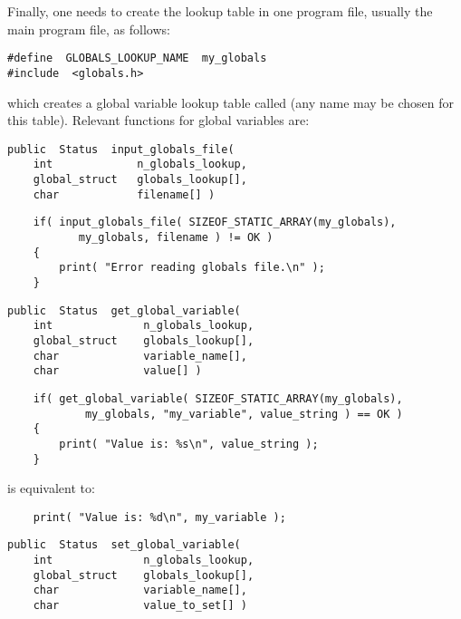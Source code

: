 Finally, one needs to create the lookup table in one program file,
usually the main program file, as follows:
{\bf\begin{verbatim}
#define  GLOBALS_LOOKUP_NAME  my_globals
#include  <globals.h>
\end{verbatim}}
which creates a global variable lookup table called
 (any name may be chosen for this table).
Relevant functions for global variables are:


{\bf\begin{verbatim}
public  Status  input_globals_file(
    int             n_globals_lookup,
    global_struct   globals_lookup[],
    char            filename[] )
\end{verbatim}}

{\bf\begin{verbatim}
    if( input_globals_file( SIZEOF_STATIC_ARRAY(my_globals),
           my_globals, filename ) != OK )
    {
        print( "Error reading globals file.\n" );
    }
\end{verbatim}}

{\bf\begin{verbatim}
public  Status  get_global_variable(
    int              n_globals_lookup,
    global_struct    globals_lookup[],
    char             variable_name[],
    char             value[] )
\end{verbatim}}

{\bf\begin{verbatim}
    if( get_global_variable( SIZEOF_STATIC_ARRAY(my_globals),
            my_globals, "my_variable", value_string ) == OK )
    {
        print( "Value is: %s\n", value_string );
    }
\end{verbatim}}
is equivalent to:
{\bf\begin{verbatim}
    print( "Value is: %d\n", my_variable );
\end{verbatim}}

{\bf\begin{verbatim}
public  Status  set_global_variable(
    int              n_globals_lookup,
    global_struct    globals_lookup[],
    char             variable_name[],
    char             value_to_set[] )
\end{verbatim}}


